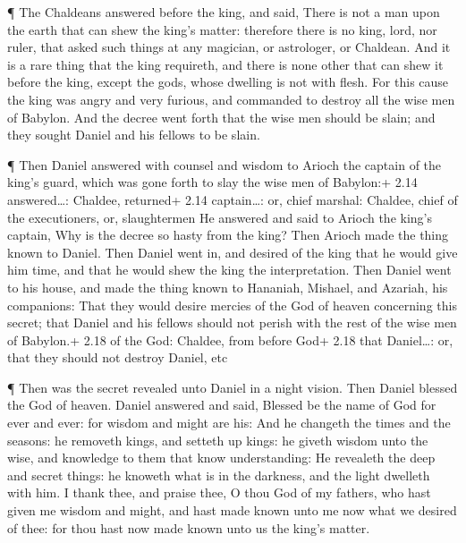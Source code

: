  ¶ The Chaldeans answered before the king, and said, There
is not a man upon the earth that can shew the king's matter: therefore
there is no king, lord, nor ruler, that asked such things at any
magician, or astrologer, or Chaldean.  And it is a rare
thing that the king requireth, and there is none other that can shew it
before the king, except the gods, whose dwelling is not with flesh.
 For this cause the king was angry and very furious, and
commanded to destroy all the wise men of Babylon.  And the
decree went forth that the wise men should be slain; and they sought
Daniel and his fellows to be slain.

 ¶ Then Daniel answered with counsel and wisdom to Arioch
the captain of the king's guard, which was gone forth to slay the wise
men of Babylon:+ 2.14 answered\ldots: Chaldee, returned+ 2.14
captain\ldots: or, chief marshal: Chaldee, chief of the executioners,
or, slaughtermen  He answered and said to Arioch the king's
captain, Why is the decree so hasty from the king? Then Arioch made the
thing known to Daniel.  Then Daniel went in, and desired of
the king that he would give him time, and that he would shew the king
the interpretation.  Then Daniel went to his house, and
made the thing known to Hananiah, Mishael, and Azariah, his companions:
 That they would desire mercies of the God of heaven
concerning this secret; that Daniel and his fellows should not perish
with the rest of the wise men of Babylon.+ 2.18 of the God: Chaldee,
from before God+ 2.18 that Daniel\ldots: or, that they should not
destroy Daniel, etc

 ¶ Then was the secret revealed unto Daniel in a night
vision. Then Daniel blessed the God of heaven.  Daniel
answered and said, Blessed be the name of God for ever and ever: for
wisdom and might are his:  And he changeth the times and
the seasons: he removeth kings, and setteth up kings: he giveth wisdom
unto the wise, and knowledge to them that know understanding:
 He revealeth the deep and secret things: he knoweth what
is in the darkness, and the light dwelleth with him.  I
thank thee, and praise thee, O thou God of my fathers, who hast given me
wisdom and might, and hast made known unto me now what we desired of
thee: for thou hast now made known unto us the king's matter.

